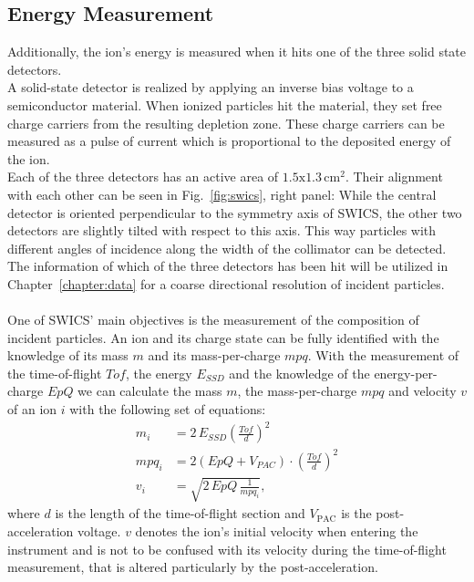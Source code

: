 \subsection{Energy Measurement}
Additionally, the ion's energy is measured when it hits one of the three solid state detectors. \\
A solid-state detector is realized by applying an inverse bias voltage to a semiconductor material. When ionized particles hit the material, they set free charge carriers from the resulting depletion zone. These charge carriers can be measured as a pulse of current which is proportional to the deposited energy of the ion. \\
Each of the three detectors has an active area of $1.5 \mathrm{x} 1.3 \,\mathrm{cm^2}$. Their alignment with each other can be seen in Fig.~\ref{fig:swics}, right panel: While the central detector is oriented perpendicular to the symmetry axis of SWICS, the other two detectors are slightly tilted with respect to this axis. This way particles with different angles of incidence along the width of the collimator can be detected. The information of which of the three detectors has been hit will be utilized in Chapter~\ref{chapter:data} for a coarse directional resolution of incident particles.
\\ \\
One of SWICS' main objectives is the measurement of the composition of incident particles. An ion and its charge state can be fully identified with the knowledge of its mass $m$ and its mass-per-charge $mpq$. 
With the measurement of the time-of-flight $Tof$, the energy $E_{SSD}$ and the knowledge of the energy-per-charge $EpQ$ we can calculate the mass $m$, the mass-per-charge $mpq$ and velocity $v$ of an ion $i$ with the following set of equations:
\begin{align}
m_i &= 2\,E_{SSD} \left( \frac{Tof}{d}\right)^2 \label{eq:swics_set1}\\
mpq_i &= 2 \left(EpQ + V_{PAC}\right) \cdot \left(\frac{Tof}{d}\right)^2 \label{eq:swics_set2} \\
v_i &= \sqrt{2\,EpQ\,\frac{1}{mpq_i}},
\label{eq:swics_set3}
\end{align}
where $d$ is the length of the time-of-flight section and $V_{\mathrm{PAC}}$ is the post-acceleration voltage. $v$ denotes the ion's initial velocity when entering the instrument and is not to be confused with its velocity during the time-of-flight measurement, that is altered particularly by the post-acceleration.
%
%
%
